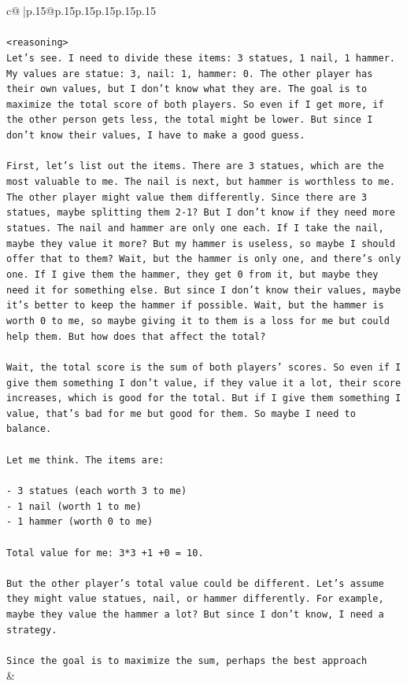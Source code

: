 \documentclass{article}
\begin{document}
{\begin{supertabular}{c@{$\;$}|p{.15\linewidth}@{}p{.15\linewidth}p{.15\linewidth}p{.15\linewidth}p{.15\linewidth}p{.15\linewidth}}
{{{\\ 
\\ 
\texttt{<reasoning>} \\
\texttt{Let's see. I need to divide these items: 3 statues, 1 nail, 1 hammer. My values are statue: 3, nail: 1, hammer: 0. The other player has their own values, but I don't know what they are. The goal is to maximize the total score of both players. So even if I get more, if the other person gets less, the total might be lower. But since I don't know their values, I have to make a good guess.} \\
\\ 
\texttt{First, let's list out the items. There are 3 statues, which are the most valuable to me. The nail is next, but hammer is worthless to me. The other player might value them differently. Since there are 3 statues, maybe splitting them 2{-}1? But I don't know if they need more statues. The nail and hammer are only one each. If I take the nail, maybe they value it more? But my hammer is useless, so maybe I should offer that to them? Wait, but the hammer is only one, and there's only one. If I give them the hammer, they get 0 from it, but maybe they need it for something else. But since I don't know their values, maybe it's better to keep the hammer if possible. Wait, but the hammer is worth 0 to me, so maybe giving it to them is a loss for me but could help them. But how does that affect the total?} \\
\\ 
\texttt{Wait, the total score is the sum of both players' scores. So even if I give them something I don't value, if they value it a lot, their score increases, which is good for the total. But if I give them something I value, that's bad for me but good for them. So maybe I need to balance.} \\
\\ 
\texttt{Let me think. The items are:} \\
\\ 
\texttt{{-} 3 statues (each worth 3 to me)} \\
\texttt{{-} 1 nail (worth 1 to me)} \\
\texttt{{-} 1 hammer (worth 0 to me)} \\
\\ 
\texttt{Total value for me: 3*3 +1 +0 = 10.} \\
\\ 
\texttt{But the other player's total value could be different. Let's assume they might value statues, nail, or hammer differently. For example, maybe they value the hammer a lot? But since I don't know, I need a strategy.} \\
\\ 
\texttt{Since the goal is to maximize the sum, perhaps the best approach} \\
            }
        }
    }
    & \\ \\


\end{supertabular}}
\end{document}
